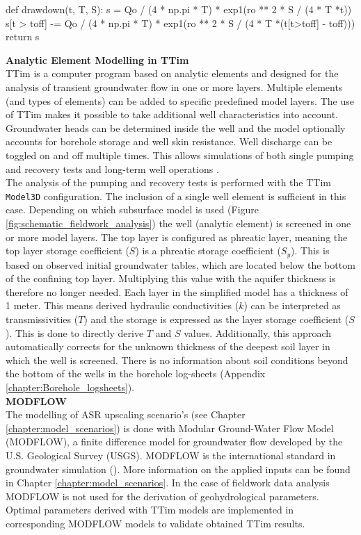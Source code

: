 \begin{python}[h!]
def drawdown(t, T, S):
    s = Qo / (4 * np.pi * T) * exp1(ro ** 2 * S / (4 * T *t))
    s[t > toff] -= Qo / (4 * np.pi * T) * exp1(ro ** 2 * S / (4 * T *(t[t>toff] - toff)))   
    return s
\end{python}

\textbf{Analytic Element Modelling in TTim}\\
TTim is a computer program based on analytic elements and designed for the analysis of transient groundwater flow in one or more layers. Multiple elements (and types of elements) can be added to specific predefined model layers. The use of TTim makes it possible to take additional well characteristics into account. Groundwater heads can be determined inside the well and the model optionally accounts for borehole storage and well skin resistance. Well discharge can be toggled on and off multiple times. This allows simulations of both single pumping and recovery tests and long-term well operations \citep{Mishra2013,Bakker2013}. \\

The analysis of the pumping and recovery tests is performed with the TTim \texttt{Model3D} configuration. The inclusion of a single well element is sufficient in this case. Depending on which subsurface model is used (Figure \ref{fig:schematic_fieldwork_analysis}) the well (analytic element) is screened in one or more model layers. The top layer is configured as phreatic layer, meaning the top layer storage coefficient ($S$) is a phreatic storage coefficient ($S_y$). This is based on observed initial groundwater tables, which are located below the bottom of the confining top layer. Multiplying this value with the aquifer thickness is therefore no longer needed. Each layer in the simplified model has a thickness of 1 meter. This means derived hydraulic conductivities ($k$) can be interpreted as transmissivities ($T$) and the storage is expressed as the layer storage coefficient ($S$). This is done to directly derive $T$ and $S$ values. Additionally, this approach automatically corrects for the unknown thickness of the deepest soil layer in which the well is screened. There is no information about soil conditions beyond the bottom of the wells in the borehole log-sheets (Appendix \ref{chapter:Borehole_logsheets}). \\

\textbf{MODFLOW}\\
The modelling of ASR upscaling scenario's (see Chapter \ref{chapter:model_scenarios}) is done with Modular Ground-Water Flow Model (MODFLOW), a finite difference model for groundwater flow developed by the U.S. Geological Survey (USGS). MODFLOW is the international standard in groundwater simulation (\citep{Niswonger2011,HarbaughArlen2005}). More information on the applied inputs can be found in Chapter \ref{chapter:model_scenarios}. In the case of fieldwork data analysis  MODFLOW is not used for the derivation of geohydrological parameters. Optimal parameters derived with TTim models are implemented in corresponding MODFLOW models to validate obtained TTim results.

